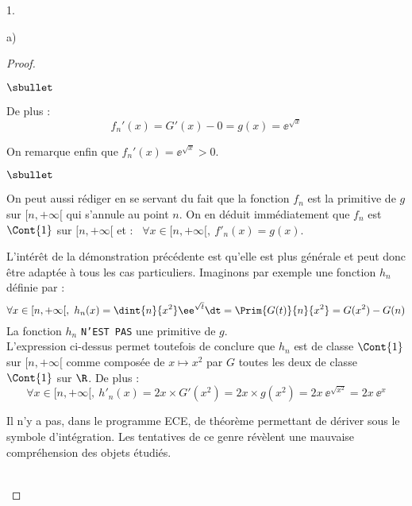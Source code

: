 \begin{noliste}{1.}
\begin{noliste}{a)}
\begin{proof}
\begin{noliste}{$\sbullet$}
      \item De plus :
        \[
        f_n'(x) = G'(x)-0 = g(x) = \ee^{\sqrt{x}}
        \]
        \conc{$\forall x \in [n,+\infty[$, $f_n'(x)= \ee^{\sqrt{x}}$}

      \item On remarque enfin que $f_n'(x) = \ee^{\sqrt{x}} > 0$.%
        \conc{La fonction $f_n$ est strictement croissante sur $[n,
          +\infty[$.}%
      \end{noliste}
      \begin{remarkL}{.98}%
        \begin{noliste}{$\sbullet$}
        \item On peut aussi rédiger en se servant du fait que la
          fonction $f_n$ est la primitive de $g$ sur $[n, +\infty[$
          qui s'annule au point $n$. On en déduit immédiatement que
          $f_n$ est $\Cont{1}$ sur $[n, +\infty[$ et : \ $\forall x
          \in [n, +\infty[, \ f'_n(x) = g(x)$.

        \item L'intérêt de la démonstration précédente est qu'elle est
          plus générale et peut donc être adaptée à tous les cas
          particuliers. Imaginons par exemple une fonction $h_n$
          définie par :\\[-.3cm]
          \[
          \forall x \in [n, +\infty[, \ h_n(x) = \dint{n}{x^2}
          \ee^{\sqrt{t}} \dt = \Prim{G(t)}{n}{x^2} = G(x^2)- G(n)
          \]
          La fonction $h_n$ {\tt N'EST PAS} une primitive de $g$.\\
          L'expression ci-dessus permet toutefois de conclure que
          $h_n$ est de classe $\Cont{1}$ sur $[n, +\infty[$ comme
          composée de $x \mapsto x^2$ par $G$ toutes les deux de
          classe $\Cont{1}$ sur $\R$. De plus :
          \[
          \forall x \in [n, +\infty[, \ h'_n(x) = 2x \times G'(x^2) =
          2x \times g(x^2) = 2x \ \ee^{\sqrt{x^2}} = 2x \
          \ee^{x}
          \]
        \item Il n'y a pas, dans le programme ECE, de théorème
          permettant de dériver sous le symbole d'intégration. Les
          tentatives de ce genre révèlent une mauvaise compréhension
          des objets étudiés.
        \end{noliste}
      \end{remarkL}~\\[-1.4cm]
    \end{proof}



\end{noliste}
\end{noliste}
